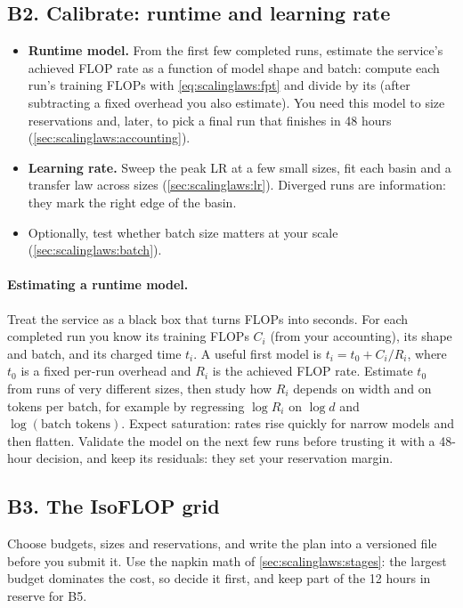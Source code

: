\subsection*{B2. Calibrate: runtime and learning rate}
\begin{itemize}
\item \textbf{Runtime model.} From the first few completed runs, estimate the service's
      achieved FLOP rate as a function of model shape and batch: compute each run's training
      FLOPs with \cref{eq:scalinglaws:fpt} and divide by its 
      (after subtracting a fixed overhead you also estimate). You need this model to size
      reservations and, later, to pick a final run that finishes in 48 hours
      (\cref{sec:scalinglaws:accounting}).
\item \textbf{Learning rate.} Sweep the peak LR at a few small sizes, fit each basin and a
      transfer law across sizes (\cref{sec:scalinglaws:lr}). Diverged runs are information:
      they mark the right edge of the basin.
\item Optionally, test whether batch size matters at your scale (\cref{sec:scalinglaws:batch}).
\end{itemize}

\paragraph{Estimating a runtime model.} Treat the service as a black box that turns FLOPs into
seconds. For each completed run you know its training FLOPs $C_i$ (from your accounting), its
shape and batch, and its charged time $t_i$. A useful first model is $t_i = t_0 + C_i/R_i$, where
$t_0$ is a fixed per-run overhead and $R_i$ is the achieved FLOP rate. Estimate $t_0$ from
runs of very different sizes, then study how $R_i$ depends on width and on tokens per batch, for
example by regressing $\log R_i$ on $\log d$ and $\log(\text{batch tokens})$. Expect saturation:
rates rise quickly for narrow models and then flatten. Validate the model on the next few runs
before trusting it with a 48-hour decision, and keep its residuals: they set your reservation
margin.

\subsection*{B3. The IsoFLOP grid}
Choose budgets, sizes and reservations, and write the plan into a versioned file before you
submit it. Use the napkin math of \cref{sec:scalinglaws:stages}: the largest budget dominates the
cost, so decide it first, and keep part of the 12 hours in reserve for B5.

